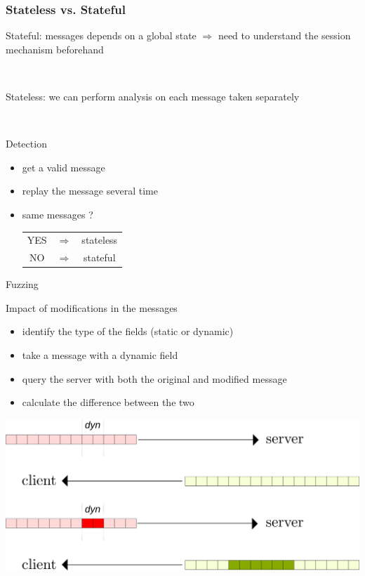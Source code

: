 \begin{frame}\frametitle{Stateless vs. Stateful}

  Stateful: messages depends on a global state $\Rightarrow$ need to understand the session mechanism beforehand

  ~

  Stateless: we can perform analysis on each message taken separately

  ~

  \begin{block}{Detection}
    \begin{itemize}
      \item get a valid message
      \item replay the message several time
      \item same messages ? \begin{tabular}{ccc}YES &$\Rightarrow$& stateless\\NO &$\Rightarrow$& stateful\end{tabular}
    \end{itemize}
  \end{block}
\end{frame}

\begin{frame}{Fuzzing}

  Impact of modifications in the messages

  \begin{itemize}
    \item identify the type of the fields (static or dynamic)
    \item take a message with a dynamic field
    \item query the server with both the original and modified message
    \item calculate the difference between the two
  \end{itemize}

  \begin{center}\includegraphics[scale=0.4]{modify.png}\end{center}

\end{frame}
